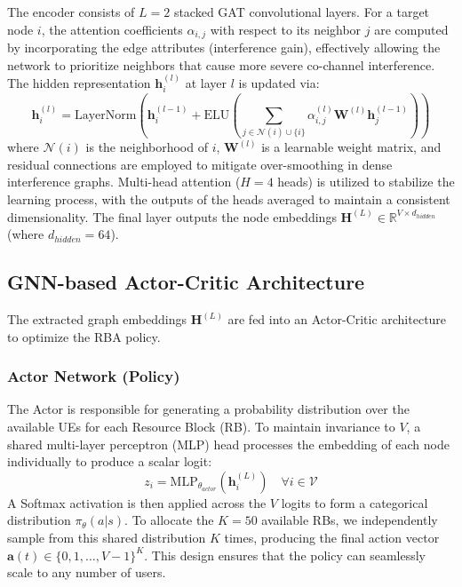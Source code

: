 The encoder consists of $L=2$ stacked GAT convolutional layers. For a target node $i$, the attention coefficients $\alpha_{i,j}$ with respect to its neighbor $j$ are computed by incorporating the edge attributes (interference gain), effectively allowing the network to prioritize neighbors that cause more severe co-channel interference.
The hidden representation $\mathbf{h}_i^{(l)}$ at layer $l$ is updated via:
\begin{equation}
    \mathbf{h}_i^{(l)} = \text{LayerNorm} \left( \mathbf{h}_i^{(l-1)} + \text{ELU} \left( \sum_{j \in \mathcal{N}(i) \cup \{i\}} \alpha_{i,j}^{(l)} \mathbf{W}^{(l)} \mathbf{h}_j^{(l-1)} \right) \right)
\end{equation}
where $\mathcal{N}(i)$ is the neighborhood of $i$, $\mathbf{W}^{(l)}$ is a learnable weight matrix, and residual connections are employed to mitigate over-smoothing in dense interference graphs. Multi-head attention ($H=4$ heads) is utilized to stabilize the learning process, with the outputs of the heads averaged to maintain a consistent dimensionality. The final layer outputs the node embeddings $\mathbf{H}^{(L)} \in \mathbb{R}^{V \times d_{hidden}}$ (where $d_{hidden}=64$).

\subsection{GNN-based Actor-Critic Architecture}
The extracted graph embeddings $\mathbf{H}^{(L)}$ are fed into an Actor-Critic architecture to optimize the RBA policy.

\subsubsection{Actor Network (Policy)}
The Actor is responsible for generating a probability distribution over the available UEs for each Resource Block (RB). To maintain invariance to $V$, a shared multi-layer perceptron (MLP) head processes the embedding of each node individually to produce a scalar logit:
\begin{equation}
    z_i = \text{MLP}_{\theta_{actor}}(\mathbf{h}_i^{(L)}) \quad \forall i \in \mathcal{V}
\end{equation}
A Softmax activation is then applied across the $V$ logits to form a categorical distribution $\pi_\theta(a|s)$. To allocate the $K=50$ available RBs, we independently sample from this shared distribution $K$ times, producing the final action vector $\mathbf{a}(t) \in \{0, 1, \dots, V-1\}^K$. This design ensures that the policy can seamlessly scale to any number of users.

